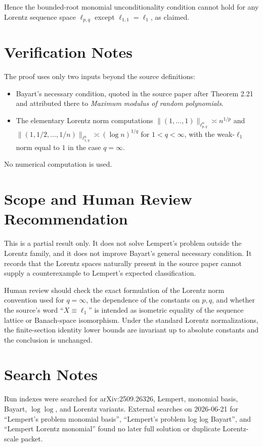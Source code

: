 \documentclass[11pt]{article}
\newcommand{\ellone}{\ell_1}
\begin{document}
Hence the bounded-root monomial unconditionality condition cannot hold for
any Lorentz sequence space \(\ell_{p,q}\) except \(\ell_{1,1}=\ellone\), as
claimed.

\section*{Verification Notes}

The proof uses only two inputs beyond the source definitions:
\begin{itemize}[leftmargin=*]
\item Bayart's necessary condition, quoted in the source paper after Theorem
2.21 and attributed there to \emph{Maximum modulus of random polynomials}.
\item The elementary Lorentz norm computations
\(\|(1,\ldots,1)\|_{\ell_{p,q}^n}\asymp n^{1/p}\) and
\(\|(1,1/2,\ldots,1/n)\|_{\ell_{1,q}^n}\asymp(\log n)^{1/q}\) for
\(1<q<\infty\), with the weak-\(\ell_1\) norm equal to \(1\) in the case
\(q=\infty\).
\end{itemize}

No numerical computation is used.

\section*{Scope and Human Review Recommendation}

This is a partial result only.  It does not solve Lempert's problem outside
the Lorentz family, and it does not improve Bayart's general necessary
condition.  It records that the Lorentz spaces naturally present in the source
paper cannot supply a counterexample to Lempert's expected classification.

Human review should check the exact formulation of the Lorentz norm convention
used for \(q=\infty\), the dependence of the constants on \(p,q\), and whether
the source's word ``\(X\equiv\ell_1\)'' is intended as isometric equality of
the sequence lattice or Banach-space isomorphism.  Under the standard Lorentz
normalizations, the finite-section identity lower bounds are invariant up to
absolute constants and the conclusion is unchanged.

\section*{Search Notes}

Run indexes were searched for arXiv:2509.26326, Lempert, monomial basis,
Bayart, \(\log\log\), and Lorentz variants.  External searches on
2026-06-21 for ``Lempert's problem monomial basis'', ``Lempert's problem log
log Bayart'', and ``Lempert Lorentz monomial'' found no later full solution or
duplicate Lorentz-scale packet.
\end{document}
